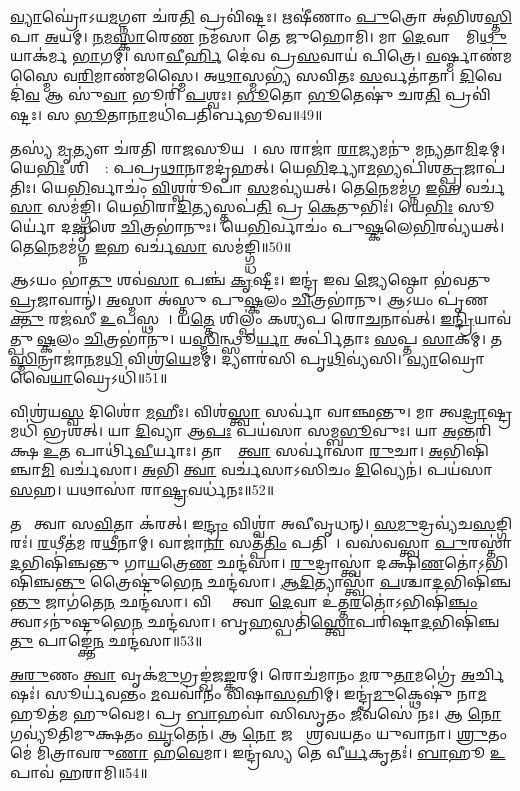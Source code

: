 \ul{𑌵𑍍𑌯𑌾}𑌘𑍍𑌰𑍋॑\-𑌽𑌯\ul{𑌮}𑌗𑍍𑌨𑍗 𑌚॑𑌰\ul{𑌤𑌿} 𑌪𑍍𑌰𑌵𑌿॑𑌷𑍍𑌟𑌃।
𑌋𑌷𑍀॑𑌣𑌾𑌂 \ul{𑌪𑍁}𑌤𑍍𑌰𑍋 𑌅॑𑌭𑌿𑌶\ul{𑌸𑍍𑌤𑌿}𑌪𑌾 \ul{𑌅}𑌯𑌮𑍍।
\ul{𑌨}\ul{𑌮}\ul{𑌸𑍍𑌕𑌾}𑌰𑍇\ul{𑌣} 𑌨𑌮॑𑌸𑌾 𑌤𑍇 𑌜𑍁𑌹𑍋𑌮𑌿।
𑌮𑌾 \ul{𑌦𑍇}𑌵𑌾𑌨𑌾𑌂᳚ 𑌮𑌿\ul{𑌥𑍁}𑌯𑌾𑌕॑𑌰𑍍𑌮 \ul{𑌭𑌾}𑌗𑌮𑍍।
𑌸𑌾\ul{𑌵𑍀}\ul{𑌰𑍍}𑌹𑌿 𑌦𑍇॑𑌵 𑌪𑍍𑌰\ul{𑌸}𑌵𑌾𑌯॑ 𑌪𑌿𑌤𑍍𑌰𑍇।
\ul{𑌵}𑌰𑍍𑌷𑍍𑌮𑌾𑌣॑𑌮𑌸𑍍𑌮𑍈 𑌵\ul{𑌰𑌿}𑌮𑌾𑌣॑𑌮𑌸𑍍𑌮𑍈।
𑌅\ul{𑌥𑌾}𑌸𑍍𑌮𑌭𑍍𑌯॑ 𑌸𑌵𑌿𑌤𑌃 \ul{𑌸}𑌰𑍍𑌵𑌤𑌾॑𑌤𑌾।
\ul{𑌦𑌿}𑌵𑍇𑌦𑌿॑\ul{𑌵} 𑌆 𑌸𑍁॑\ul{𑌵𑌾} 𑌭𑍂𑌰𑌿॑ \ul{𑌪}𑌶𑍍𑌵𑌃।
\ul{𑌭𑍂}𑌤𑍋 \ul{𑌭𑍂}𑌤𑍇𑌷𑍁॑ 𑌚𑌰\ul{𑌤𑌿} 𑌪𑍍𑌰𑌵𑌿॑𑌷𑍍𑌟𑌃।
𑌸 \ul{𑌭𑍂}𑌤𑌾\ul{𑌨𑌾}𑌮𑌧𑌿॑𑌪𑌤𑌿𑌰𑍍𑌬𑌭𑍂𑌵॥49॥

𑌤𑌸𑍍𑌯॑ \ul{𑌮𑍃}𑌤𑍍𑌯𑍗 𑌚॑𑌰𑌤𑌿 𑌰𑌾\ul{𑌜}𑌸𑍂𑌯𑌮𑍍᳚।
𑌸 𑌰𑌾𑌜𑌾॑ \ul{𑌰𑌾}𑌜𑍍𑌯𑌮𑌨𑍁॑ 𑌮𑌨𑍍𑌯𑌤𑌾\ul{𑌮𑌿}𑌦𑌮𑍍।
𑌯𑍇\ul{𑌭𑌿𑌃} 𑌶𑌿𑌲𑍍𑌪𑍈᳚: 𑌪𑌪𑍍𑌰\ul{𑌥𑌾}𑌨𑌾𑌮𑌦𑍃॑𑌹𑌤𑍍।
𑌯𑍇\ul{𑌭𑌿}𑌰𑍍𑌦𑍍𑌯𑌾\ul{𑌮}𑌭𑍍𑌯𑌪𑌿॑𑌶\ul{𑌤𑍍𑌪𑍍𑌰}𑌜𑌾𑌪॑𑌤𑌿𑌃।
𑌯𑍇\ul{𑌭𑌿}𑌰𑍍𑌵𑌾𑌚𑌂॑ \ul{𑌵𑌿}𑌶𑍍𑌵𑌰𑍂॑𑌪𑌾 \ul{𑌸}𑌮𑌵𑍍𑌯॑𑌯𑌤𑍍।
𑌤𑍇\ul{𑌨𑍇}𑌮𑌮॑𑌗𑍍𑌨 \ul{𑌇}𑌹 𑌵𑌰𑍍𑌚॑\ul{𑌸𑌾} 𑌸𑌮॑𑌙𑍍𑌗𑍍𑌧𑌿।
𑌯𑍇𑌭𑌿॑𑌰𑌾\ul{𑌦𑌿}𑌤𑍍𑌯𑌸𑍍𑌤𑌪॑\ul{𑌤𑌿} 𑌪𑍍𑌰 \ul{𑌕𑍇}𑌤𑍁𑌭𑌿𑌃॑।
𑌯𑍇\ul{𑌭𑌿𑌃} 𑌸𑍂𑌰𑍍𑌯𑍋॑ 𑌦\ul{𑌦𑍃}𑌶𑍇 \ul{𑌚𑌿}𑌤𑍍𑌰𑌭𑌾॑𑌨𑍁𑌃।
𑌯𑍇\ul{𑌭𑌿}𑌰𑍍𑌵𑌾𑌚𑌂॑ 𑌪𑍁\ul{𑌷𑍍𑌕}𑌲𑍇\ul{𑌭𑌿}𑌰𑌵𑍍𑌯॑𑌯𑌤𑍍।
𑌤𑍇\ul{𑌨𑍇}𑌮𑌮॑𑌗𑍍𑌨 \ul{𑌇}𑌹 𑌵𑌰𑍍𑌚॑\ul{𑌸𑌾} 𑌸𑌮॑𑌙𑍍𑌗𑍍𑌧𑌿॥50॥

𑌆𑌽𑌯𑌂 𑌭𑌾॑\ul{𑌤𑍁} 𑌶𑌵॑\ul{𑌸𑌾} 𑌪𑌞𑍍𑌚॑ \ul{𑌕𑍃}𑌷𑍍𑌟𑍀𑌃।
𑌇𑌨𑍍𑌦𑍍𑌰॑ 𑌇𑌵 \ul{𑌜𑍍𑌯𑍇}𑌷𑍍𑌠𑍋 𑌭॑𑌵𑌤𑍁 \ul{𑌪𑍍𑌰}𑌜𑌾𑌵𑌾𑌨𑍍॑।
\ul{𑌅}𑌸𑍍𑌮𑌾 𑌅॑𑌸𑍍𑌤𑍁 𑌪𑍁\ul{𑌷𑍍𑌕}𑌲𑌂 \ul{𑌚𑌿}𑌤𑍍𑌰𑌭𑌾॑𑌨𑍁।
𑌆𑌽𑌯𑌂 𑌪𑍃॑𑌣\ul{𑌕𑍍𑌤𑍁} 𑌰𑌜॑𑌸𑍀 \ul{𑌉}𑌪𑌸𑍍𑌥𑌮𑍍᳚।
𑌯\ul{𑌤𑍍𑌤𑍇} 𑌶𑌿𑌲𑍍𑌪𑌂॑ 𑌕𑌶𑍍𑌯𑌪 𑌰𑍋\ul{𑌚}𑌨𑌾𑌵॑𑌤𑍍।
\ul{𑌇}\ul{𑌨𑍍𑌦𑍍𑌰𑌿}𑌯𑌾𑌵॑𑌤𑍍𑌪𑍁\ul{𑌷𑍍𑌕}𑌲𑌂 \ul{𑌚𑌿}𑌤𑍍𑌰𑌭𑌾॑𑌨𑍁।
𑌯\ul{𑌸𑍍𑌮𑌿}𑌨𑍍𑌥𑍍𑌸𑍂\ul{𑌰𑍍𑌯𑌾} 𑌅𑌰𑍍𑌪𑌿॑𑌤𑌾𑌃 \ul{𑌸}𑌪𑍍𑌤 \ul{𑌸𑌾}𑌕𑌮𑍍।
𑌤\ul{𑌸𑍍𑌮𑌿}𑌨𑍍𑌰𑌾𑌜𑌾॑\ul{𑌨}𑌮\ul{𑌧𑌿} 𑌵𑌿𑌶𑍍𑌰॑\ul{𑌯𑍇}𑌮𑌮𑍍।
𑌦𑍍𑌯𑍗𑌰॑𑌸𑌿 𑌪𑍃\ul{𑌥𑌿}𑌵𑍍𑌯॑𑌸𑌿।
\ul{𑌵𑍍𑌯𑌾}𑌘𑍍𑌰𑍋 𑌵𑍈\ul{𑌯𑌾}𑌘𑍍𑌰𑍇\-𑌽𑌧𑌿॑॥51॥

𑌵𑌿𑌶𑍍𑌰॑𑌯\ul{𑌸𑍍𑌵} 𑌦𑌿𑌶𑍋॑ \ul{𑌮}𑌹𑍀𑌃।
𑌵𑌿𑌶॑\ul{𑌸𑍍𑌤𑍍𑌵𑌾} 𑌸𑌰𑍍𑌵𑌾॑ 𑌵𑌾𑌞𑍍𑌛𑌨𑍍𑌤𑍁।
𑌮𑌾 𑌤𑍍𑌵\ul{𑌦𑍍𑌰𑌾}𑌷𑍍𑌟𑍍𑌰𑌮𑌧𑌿॑ 𑌭𑍍𑌰𑌶𑌤𑍍।
𑌯𑌾 \ul{𑌦𑌿}𑌵𑍍𑌯𑌾 𑌆\ul{𑌪𑌃} 𑌪𑌯॑𑌸𑌾 𑌸𑌮𑍍𑌬\ul{𑌭𑍂}𑌵𑍁𑌃।
𑌯𑌾 \ul{𑌅}𑌨𑍍𑌤𑌰𑌿॑𑌕𑍍𑌷 \ul{𑌉}𑌤 𑌪𑌾𑌰𑍍𑌥𑌿॑\ul{𑌵𑍀}𑌰𑍍𑌯𑌾𑌃।
𑌤𑌾𑌸𑌾𑌂᳚ \ul{𑌤𑍍𑌵𑌾} 𑌸𑌰𑍍𑌵𑌾॑𑌸𑌾 \ul{𑌰𑍁}𑌚𑌾।
\ul{𑌅}𑌭𑌿𑌷𑌿॑𑌞𑍍𑌚𑌾\ul{𑌮𑌿} 𑌵𑌰𑍍𑌚॑𑌸𑌾।
\ul{𑌅}𑌭𑌿 \ul{𑌤𑍍𑌵𑌾} 𑌵𑌰𑍍𑌚॑𑌸𑌾\-𑌽𑌸𑌿𑌚𑌂 \ul{𑌦𑌿}𑌵𑍍𑌯𑍇𑌨॑।
𑌪𑌯॑𑌸𑌾 \ul{𑌸}𑌹।
𑌯𑌥𑌾𑌸𑌾॑ 𑌰𑌾\ul{𑌷𑍍𑌟𑍍𑌰}𑌵𑌰𑍍𑌧॑𑌨𑌃॥52॥

𑌤𑌥𑌾᳚ 𑌤𑍍𑌵𑌾 𑌸\ul{𑌵𑌿}𑌤𑌾 𑌕॑𑌰𑌤𑍍।
𑌇\ul{𑌨𑍍𑌦𑍍𑌰𑌂} 𑌵𑌿𑌶𑍍𑌵𑌾॑ 𑌅𑌵𑍀𑌵𑍃𑌧𑌨𑍍।
\ul{𑌸}\ul{𑌮𑍁}𑌦𑍍𑌰𑌵𑍍𑌯॑𑌚\ul{𑌸}𑌙𑍍𑌗𑌿𑌰𑌃॑।
\ul{𑌰}𑌥𑍀𑌤॑𑌮 𑌰\ul{𑌥𑍀}𑌨𑌾𑌮𑍍।
𑌵𑌾𑌜𑌾॑\ul{𑌨𑌾}\ul{} 𑌸𑌤𑍍𑌪॑\ul{𑌤𑌿𑌂} 𑌪𑌤𑌿𑌮𑍍᳚।
𑌵𑌸॑𑌵𑌸𑍍𑌤𑍍𑌵𑌾 \ul{𑌪𑍁}𑌰𑌸𑍍𑌤𑌾॑\ul{𑌦}𑌭𑌿𑌷𑌿॑𑌞𑍍𑌚𑌨𑍍𑌤𑍁 𑌗𑌾\ul{𑌯}𑌤𑍍𑌰𑍇\ul{𑌣} 𑌛𑌨𑍍𑌦॑𑌸𑌾।
\ul{𑌰𑍁}𑌦𑍍𑌰𑌾𑌸𑍍𑌤𑍍𑌵𑌾॑ 𑌦𑌕𑍍𑌷𑌿\ul{𑌣}𑌤𑍋॑\-𑌽𑌭𑌿𑌷𑌿॑𑌞𑍍𑌚\ul{𑌨𑍍𑌤𑍁} 𑌤𑍍𑌰𑍈𑌷𑍍𑌟𑍁॑𑌭𑍇\ul{𑌨} 𑌛𑌨𑍍𑌦॑𑌸𑌾।
\ul{𑌆}\ul{𑌦𑌿}𑌤𑍍𑌯𑌾𑌸𑍍𑌤𑍍𑌵𑌾॑ \ul{𑌪}𑌶𑍍𑌚𑌾\ul{𑌦}𑌭𑌿𑌷𑌿॑𑌞𑍍𑌚\ul{𑌨𑍍𑌤𑍁} 𑌜𑌾𑌗॑𑌤𑍇\ul{𑌨} 𑌛𑌨𑍍𑌦॑𑌸𑌾।
𑌵𑌿𑌶𑍍𑌵𑍇᳚ 𑌤𑍍𑌵𑌾 \ul{𑌦𑍇}𑌵𑌾 𑌉॑𑌤𑍍𑌤\ul{𑌰}𑌤𑍋॑\-𑌽𑌭𑌿𑌷𑌿॑\ul{𑌞𑍍𑌚𑌂} 𑌤𑍍𑌵𑌾𑌽𑌨𑍁॑𑌷𑍍𑌟𑍁𑌭𑍇\ul{𑌨} 𑌛𑌨𑍍𑌦॑𑌸𑌾। 
𑌬𑍃\ul{𑌹}𑌸𑍍𑌪𑌤𑌿॑\ul{𑌸𑍍𑌤𑍍𑌵𑍋}𑌪𑌰𑌿॑𑌷𑍍𑌟𑌾\ul{𑌦}𑌭𑌿𑌷𑌿॑𑌞𑍍𑌚\ul{𑌤𑍁} 𑌪𑌾𑌙𑍍𑌕𑍍𑌤𑍇॑\ul{𑌨} 𑌛𑌨𑍍𑌦॑𑌸𑌾॥53॥

\ul{𑌅}\ul{𑌰𑍁}𑌣𑌂 \ul{𑌤𑍍𑌵𑌾} 𑌵𑍃𑌕॑\ul{𑌮𑍁}𑌗𑍍𑌰𑌙𑍍𑌖॑𑌜\ul{𑌙𑍍𑌕}𑌰𑌮𑍍।
𑌰𑍋𑌚॑𑌮𑌾𑌨𑌂 \ul{𑌮}𑌰𑍁\ul{𑌤𑌾}𑌮𑌗𑍍𑌰𑍇॑ \ul{𑌅}𑌰𑍍𑌚𑌿𑌷𑌃॑।
𑌸𑍂𑌰𑍍𑌯॑𑌵𑌨𑍍𑌤𑌂 \ul{𑌮}𑌘𑌵𑌾॑𑌨𑌂 𑌵𑌿𑌷𑌾\ul{𑌸}𑌹𑌿𑌮𑍍।
𑌇𑌨𑍍𑌦𑍍𑌰॑\ul{𑌮𑍁}𑌕𑍍𑌥𑍇𑌷𑍁॑ 𑌨𑌾\ul{𑌮}𑌹𑍂𑌤॑𑌮 𑌹𑍁𑌵𑍇𑌮।
𑌪𑍍𑌰 \ul{𑌬𑌾}𑌹𑌵𑌾॑ 𑌸𑌿𑌸𑍃𑌤𑌂 \ul{𑌜𑍀}𑌵𑌸𑍇॑ 𑌨𑌃।
𑌆 \ul{𑌨𑍋} 𑌗𑌵𑍍𑌯𑍂॑𑌤𑌿𑌮𑍁𑌕𑍍𑌷𑌤𑌂 \ul{𑌘𑍃}𑌤𑍇𑌨॑।
𑌆 \ul{𑌨𑍋} 𑌜𑌨𑍇᳚ 𑌶𑍍𑌰𑌵𑌯𑌤𑌂 𑌯𑍁𑌵𑌾𑌨𑌾।
\ul{𑌶𑍍𑌰𑍁}𑌤𑌂 𑌮𑍇॑ 𑌮𑌿𑌤𑍍𑌰𑌾𑌵𑌰𑍁\ul{𑌣𑌾} 𑌹\ul{𑌵𑍇}𑌮𑌾।
𑌇𑌨𑍍𑌦𑍍𑌰॑𑌸𑍍𑌯 𑌤𑍇 𑌵𑍀\ul{𑌰𑍍𑌯}𑌕𑍃𑌤𑌃॑।
\ul{𑌬𑌾}𑌹𑍂 \ul{𑌉}𑌪𑌾𑌵॑ 𑌹𑌰𑌾𑌮𑌿॥54॥\anuvakamend[\ul{𑌬}\ul{𑌭𑍂}𑌵𑌾𑌵𑍍𑌯॑\ul{𑌯}𑌤𑍍𑌤𑍇\ul{𑌨𑍇}𑌮𑌮॑𑌗𑍍𑌨 \ul{𑌇}𑌹 𑌵𑌰𑍍𑌚॑\ul{𑌸𑌾} 𑌸𑌮॑\ul{𑌙𑍍𑌗𑍍𑌧𑌿} 𑌵𑍈\ul{𑌯𑌾}𑌘𑍍𑌰𑍇𑌽𑌧𑌿॑ 𑌰𑌾\ul{𑌷𑍍𑌟𑍍𑌰}𑌵𑌰𑍍𑌧॑\ul{𑌨𑌃} 𑌪𑌾𑌙𑍍𑌕𑍍𑌤𑍇॑\ul{𑌨} 𑌛𑌨𑍍𑌦॑\ul{𑌸𑍋}𑌪𑌾𑌵॑𑌹𑌰𑌾𑌮𑌿]

